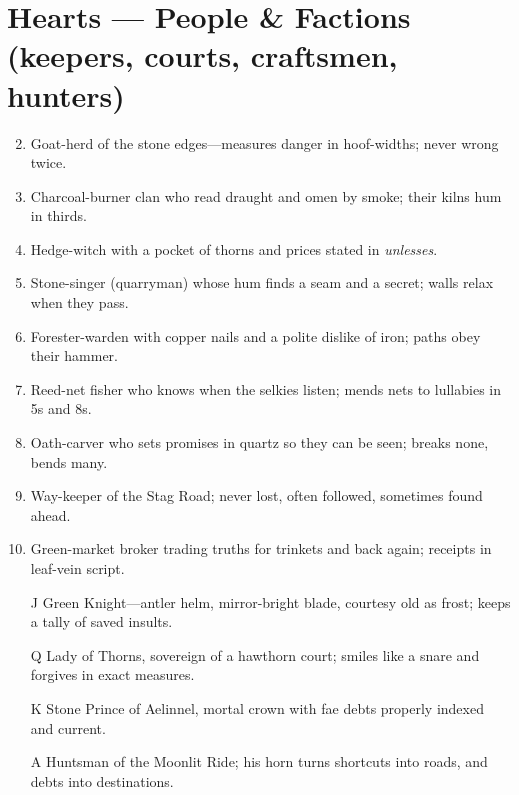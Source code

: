 \section{Hearts --- People \& Factions (keepers, courts, craftsmen, hunters)}
\label{sec:aelinnel-people}
\begin{enumerate}
\setcounter{enumi}{1}
\item Goat-herd of the stone edges---measures danger in hoof-widths; never wrong twice.
\item Charcoal-burner clan who read draught and omen by smoke; their kilns hum in thirds.
\item Hedge-witch with a pocket of thorns and prices stated in \emph{unlesses}.
\item Stone-singer (quarryman) whose hum finds a seam and a secret; walls relax when they pass.
\item Forester-warden with copper nails and a polite dislike of iron; paths obey their hammer.
\item Reed-net fisher who knows when the selkies listen; mends nets to lullabies in 5s and 8s.
\item Oath-carver who sets promises in quartz so they can be seen; breaks none, bends many.
\item Way-keeper of the Stag Road; never lost, often followed, sometimes found ahead.
\item Green-market broker trading truths for trinkets and back again; receipts in leaf-vein script.
\item[J] Green Knight---antler helm, mirror-bright blade, courtesy old as frost; keeps a tally of saved insults.
\item[Q] Lady of Thorns, sovereign of a hawthorn court; smiles like a snare and forgives in exact measures.
\item[K] Stone Prince of Aelinnel, mortal crown with fae debts properly indexed and current.
\item[A] Huntsman of the Moonlit Ride; his horn turns shortcuts into roads, and debts into destinations.
\end{enumerate}


